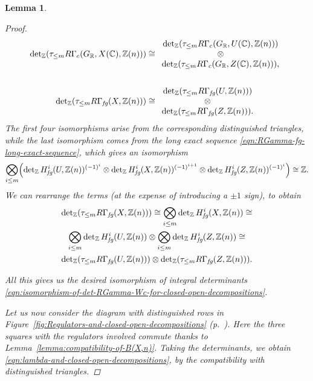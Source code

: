 \documentclass[10pt,a4paper,oneside]{article}
\newcommand{\CC}{\mathbb{C}}
\newcommand{\RR}{\mathbb{R}}
\newcommand{\ZZ}{\mathbb{Z}}
\renewcommand{\det}{\operatorname{det}}
\newcommand{\fg}{\text{\it fg}}
\theoremstyle{myplain}
\newtheorem{lemma}[theorem]{Lemma}
\theoremstyle{mydefinition}
\numberwithin{equation}{section}
\begin{document}
\begin{lemma}
\begin{proof}
\begin{align*}
      \det_\ZZ (\tau_{\le m} R\Gamma_c (G_\RR, X (\CC), \ZZ(n))) & \cong \begin{array}{c} \det_\ZZ (\tau_{\le m} R\Gamma_c (G_\RR, U (\CC), \ZZ (n))) \\ \otimes \\ \det_\ZZ (\tau_{\le m} R\Gamma_c (G_\RR, Z (\CC), \ZZ(n))), \end{array} \\
      \\
      \det_\ZZ (\tau_{\le m} R\Gamma_\fg (X, \ZZ(n))) & \cong \begin{array}{c} \det_\ZZ (\tau_{\le m} R\Gamma_\fg (U, \ZZ (n))) \\ \otimes \\ \det_\ZZ (\tau_{\le m} R\Gamma_\fg (Z, \ZZ(n))).\end{array}
    \end{align*}
    The first four isomorphisms arise from the corresponding distinguished
    triangles, while the last isomorphism comes from the long exact sequence
    \eqref{eqn:RGamma-fg-long-exact-sequence}, which gives an isomorphism
    \begin{equation}\small
      \bigotimes_{i \le m}
      \Bigl(\det_\ZZ H^i_\fg (U, \ZZ(n))^{(-1)^i} \otimes
      \det_\ZZ H^i_\fg (X, \ZZ(n))^{(-1)^{i+1}} \otimes
      \det_\ZZ H^i_\fg (Z, \ZZ(n))^{(-1)^i}\Bigr) \cong \ZZ.
    \end{equation}
    We can rearrange the terms
    (at the expense of introducing a $\pm 1$ sign),
    to obtain
    \begin{multline*}
      \det_\ZZ (\tau_{\le m} R\Gamma_\fg (X, \ZZ(n))) \cong
      \bigotimes_{i \le m} \det_\ZZ H^i_\fg (X, \ZZ(n)) \cong \\
      \bigotimes_{i \le m} \det_\ZZ H^i_\fg (U, \ZZ(n)) \otimes
      \bigotimes_{i \le m} \det_\ZZ H^i_\fg (Z, \ZZ(n)) \cong \\
      \det_\ZZ (\tau_{\le m} R\Gamma_\fg (U, \ZZ(n))) \otimes
      \det_\ZZ (\tau_{\le m} R\Gamma_\fg (Z, \ZZ(n))).
    \end{multline*}

    All this gives us the desired isomorphism of integral determinants
    \eqref{eqn:isomorphism-of-det-RGamma-Wc-for-closed-open-decompositions}.

    Let us now consider the diagram with distinguished rows in
    Figure~\ref{fig:Regulators-and-closed-open-decompositions}
    (p.~\pageref{fig:Regulators-and-closed-open-decompositions}).
    Here the three squares with the regulators involved commute thanks to
    Lemma~\ref{lemma:compatibility-of-B(X,n)}. Taking the determinants, we
    obtain \eqref{eqn:lambda-and-closed-open-decompositions}, by the
    compatibility with distinguished triangles.
  \end{proof}
\end{lemma}
\end{document}
